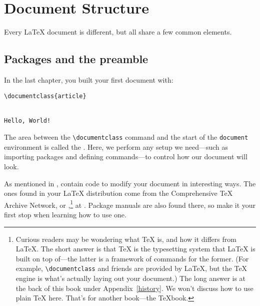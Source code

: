 \chapter{Document Structure}
\label{structure}

Every \LaTeX{} document is different,
but all share a few common elements.

\section{Packages and the preamble}
In the last chapter, you built your first document with:
\begin{leftfigure}
\begin{lstlisting}
\documentclass{article}


Hello, World!

\end{lstlisting}
\end{leftfigure}
The area between the \verb|\documentclass| command and the start of the
\texttt{document} environment is called the .
Here, we perform any setup we need---such as importing packages
and defining commands---to control how our document
will look.

As mentioned in ,
 contain code to modify your document in interesting ways.
The ones found in your \LaTeX{} distribution come from the Comprehensive \TeX{}
Archive Network, or ,\punckern\footnote{Curious readers may
be wondering what \TeX{} is, and how it differs from \LaTeX.
The short answer is that \TeX{} is the typesetting system that \LaTeX{}
is built on top of---the latter is a framework of commands for the former.
(For example, \texttt{\textbackslash documentclass} and friends are provided by
\LaTeX{}, but the \TeX{} engine is what's actually laying out your document.)
The long answer is at the back of this book under Appendix~\ref{history}.
We won't discuss how to use plain \TeX{} here. That's for another book---the
\TeX book.}
at .
Package manuals are also found there,
so make it your first stop when learning how to use one.

